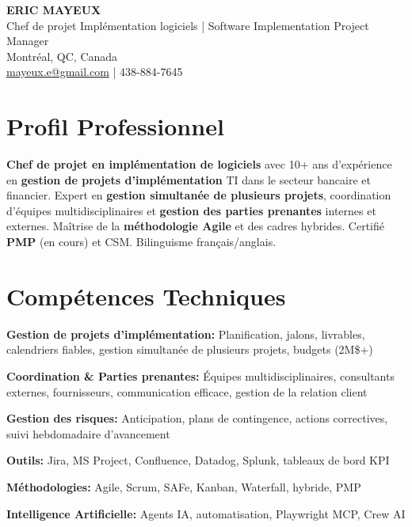 \documentclass[11pt,a4paper]{article}
\begin{document}
\begin{center}
    {\LARGE \textbf{ERIC MAYEUX}}\\
    \vspace{4pt}
    {\large Chef de projet Implémentation logiciels | Software Implementation Project Manager}\\
    \vspace{4pt}
    Montréal, QC, Canada\\
    \href{mailto:mayeux.e@gmail.com}{mayeux.e@gmail.com} | 438-884-7645
\end{center}

\vspace{8pt}

\section*{Profil Professionnel}
\noindent
\textbf{Chef de projet en implémentation de logiciels} avec 10+ ans d'expérience en \textbf{gestion de projets d'implémentation} TI dans le secteur bancaire et financier. Expert en \textbf{gestion simultanée de plusieurs projets}, coordination d'équipes multidisciplinaires et \textbf{gestion des parties prenantes} internes et externes. Maîtrise de la \textbf{méthodologie Agile} et des cadres hybrides. Certifié \textbf{PMP} (en cours) et CSM. Bilinguisme français/anglais.

\section*{Compétences Techniques}

\textbf{Gestion de projets d'implémentation:} Planification, jalons, livrables, calendriers fiables, gestion simultanée de plusieurs projets, budgets (2M\$+)

\textbf{Coordination \& Parties prenantes:} Équipes multidisciplinaires, consultants externes, fournisseurs, communication efficace, gestion de la relation client

\textbf{Gestion des risques:} Anticipation, plans de contingence, actions correctives, suivi hebdomadaire d'avancement

\textbf{Outils:} Jira, MS Project, Confluence, Datadog, Splunk, tableaux de bord KPI

\textbf{Méthodologies:} Agile, Scrum, SAFe, Kanban, Waterfall, hybride, PMP

\textbf{Intelligence Artificielle:} Agents IA, automatisation, Playwright MCP, Crew AI
\end{document}
